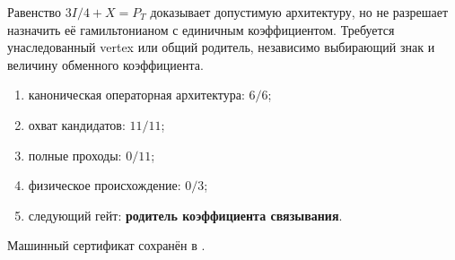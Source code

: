 \begin{nogocriterion}
Равенство $3I/4+X=P_T$ доказывает допустимую архитектуру, но не разрешает
назначить её гамильтонианом с единичным коэффициентом. Требуется
унаследованный vertex или общий родитель, независимо выбирающий знак и
величину обменного коэффициента.
\end{nogocriterion}

\begin{protocol}\begin{enumerate}
\item каноническая операторная архитектура: \textbf{$6/6$};
\item охват кандидатов: \textbf{$11/11$};
\item полные проходы: \textbf{$0/11$};
\item физическое происхождение: \textbf{$0/3$};
\item следующий гейт: \textbf{родитель коэффициента связывания}.
\end{enumerate}\end{protocol}

Машинный сертификат сохранён в
.